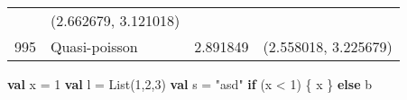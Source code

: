 \documentclass[12pt,]{article}
\newenvironment{Shaded}{}{}
\newcommand{\KeywordTok}[1]{\textcolor[rgb]{0.00,0.44,0.13}{\textbf{{#1}}}}
\newcommand{\DecValTok}[1]{\textcolor[rgb]{0.25,0.63,0.44}{{#1}}}
\newcommand{\StringTok}[1]{\textcolor[rgb]{0.25,0.44,0.63}{{#1}}}
\newcommand{\NormalTok}[1]{{#1}}
\begin{document}
\begin{longtable}[]{@{}clcc@{}}
\begin{minipage}[t]{0.21\columnwidth}
\end{minipage} & \begin{minipage}[t]{0.27\columnwidth}\centering\strut
(2.662679, 3.121018)\strut
\end{minipage}\tabularnewline
\begin{minipage}[t]{0.11\columnwidth}\centering\strut
995\strut
\end{minipage} & \begin{minipage}[t]{0.18\columnwidth}\raggedright\strut
Quasi-poisson\strut
\end{minipage} & \begin{minipage}[t]{0.21\columnwidth}\centering\strut
2.891849\strut
\end{minipage} & \begin{minipage}[t]{0.27\columnwidth}\centering\strut
(2.558018, 3.225679)\strut
\end{minipage}\tabularnewline
\bottomrule
\end{longtable}

\begin{Shaded}
\begin{Highlighting}[]
\KeywordTok{val} \NormalTok{x = }\DecValTok{1}
\KeywordTok{val} \NormalTok{l = List(}\DecValTok{1}\NormalTok{,}\DecValTok{2}\NormalTok{,}\DecValTok{3}\NormalTok{)}
\KeywordTok{val} \NormalTok{s = }\StringTok{"asd"}
\KeywordTok{if} \NormalTok{(x < }\DecValTok{1}\NormalTok{) \{}
  \NormalTok{x }
\NormalTok{\} }\KeywordTok{else} \NormalTok{b}
\end{Highlighting}
\end{Shaded}
\end{document}
